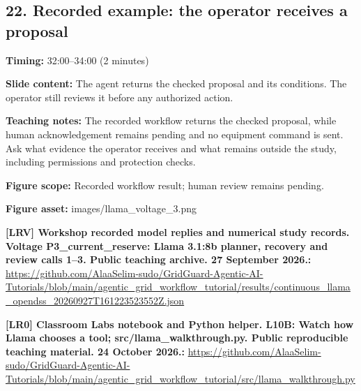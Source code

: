 \documentclass[10pt,letterpaper]{article}
\begin{document}
\subsection*{22. Recorded example: the operator receives a proposal}
\textbf{Timing:} 32:00--34:00 (2 minutes)\par
\textbf{Slide content:} The agent returns the checked proposal and its conditions.
The operator still reviews it before any authorized action.\par
\textbf{Teaching notes:} The recorded workflow returns the checked proposal, while human acknowledgement remains pending and no equipment command is sent. Ask what evidence the operator receives and what remains outside the study, including permissions and protection checks.\par
\textbf{Figure scope:} Recorded workflow result; human review remains pending.\par
\textbf{Figure asset:} images/llama\_voltage\_3.png\par
\textbf{[LRV] Workshop recorded model replies and numerical study records. Voltage P3\_current\_reserve: Llama 3.1:8b planner, recovery and review calls 1--3. Public teaching archive. 27 September 2026.:} \href{https://github.com/AlaaSelim-sudo/GridGuard-Agentic-AI-Tutorials/blob/main/agentic_grid_workflow_tutorial/results/continuous_llama_opendss_20260927T161223523552Z.json}{\small\ttfamily https:/\allowbreak{}/\allowbreak{}github.\allowbreak{}com/\allowbreak{}AlaaSelim-\allowbreak{}sudo/\allowbreak{}GridGuard-\allowbreak{}Agentic-\allowbreak{}AI-\allowbreak{}Tutorials/\allowbreak{}blob/\allowbreak{}main/\allowbreak{}agentic\_\allowbreak{}grid\_\allowbreak{}workflow\_\allowbreak{}tutorial/\allowbreak{}results/\allowbreak{}continuous\_\allowbreak{}llama\_\allowbreak{}opendss\_\allowbreak{}20260927T161223523552Z.\allowbreak{}json}\par
\textbf{[LR0] Classroom Labs notebook and Python helper. L10B: Watch how Llama chooses a tool; src/llama\_walkthrough.py. Public reproducible teaching material. 24 October 2026.:} \href{https://github.com/AlaaSelim-sudo/GridGuard-Agentic-AI-Tutorials/blob/main/agentic_grid_workflow_tutorial/src/llama_walkthrough.py}{\small\ttfamily https:/\allowbreak{}/\allowbreak{}github.\allowbreak{}com/\allowbreak{}AlaaSelim-\allowbreak{}sudo/\allowbreak{}GridGuard-\allowbreak{}Agentic-\allowbreak{}AI-\allowbreak{}Tutorials/\allowbreak{}blob/\allowbreak{}main/\allowbreak{}agentic\_\allowbreak{}grid\_\allowbreak{}workflow\_\allowbreak{}tutorial/\allowbreak{}src/\allowbreak{}llama\_\allowbreak{}walkthrough.\allowbreak{}py}\par
\par\medskip
\end{document}
